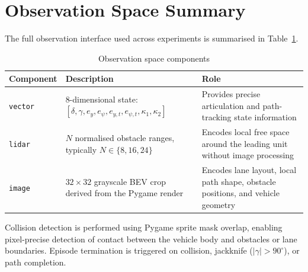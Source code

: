 \section{Observation Space Summary}

The full observation interface used across experiments is summarised in Table~\ref{tab:observation_components}.

\begin{table}[H]
\centering
\caption{Observation space components}
\label{tab:observation_components}
\begin{tabular}{p{3cm} p{5cm} p{5cm}}
\toprule
Component & Description & Role \\
\midrule
\texttt{vector} & 8-dimensional state: $[\delta,\gamma,e_y,e_\psi,e_{y,t},e_{\psi,t},\kappa_1,\kappa_2]$ & Provides precise articulation and path-tracking state information \\
\texttt{lidar} & $N$ normalised obstacle ranges, typically $N \in \{8,16,24\}$ & Encodes local free space around the leading unit without image processing \\
\texttt{image}  & $32 \times 32$ grayscale BEV crop derived from the Pygame render & Encodes lane layout, local path shape, obstacle positions, and vehicle geometry \\
\bottomrule
\end{tabular}
\end{table}

Collision detection is performed using Pygame sprite mask overlap, enabling pixel-precise detection of contact between the vehicle body and obstacles or lane boundaries. Episode termination is triggered on collision, jackknife ($|\gamma| > 90^\circ$), or path completion.

